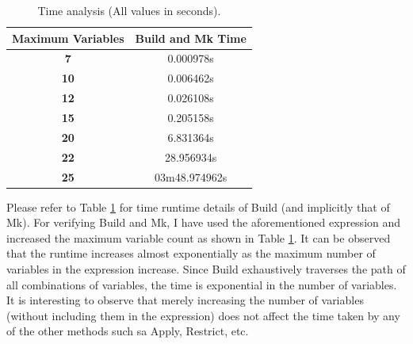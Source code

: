 \documentclass[a4paper, titlepage, 12pt]{article}
\numberwithin{equation}{section}
\begin{document}
            \begin{table}[H]
                \centering
                \caption{Time analysis (All values in seconds).}
                \label{tab:time_analysis}
                \begin{tabular}{|c|c|}
                    \hline \textbf{Maximum Variables} & \textbf{Build and Mk Time} \\ \hline
                    \textbf{7} & 0.000978s \\ \hline
                    \textbf{10} & 0.006462s \\ \hline
                    \textbf{12} & 0.026108s \\ \hline
                    \textbf{15} & 0.205158s \\ \hline
                    \textbf{20} & 6.831364s \\ \hline
                    \textbf{22} & 28.956934s \\ \hline
                    \textbf{25} & 03m48.974962s \\ \hline
                \end{tabular}
            \end{table}

            Please refer to Table \ref{tab:time_analysis} for time runtime details of Build (and implicitly that of Mk).
            For verifying Build and Mk, I have used the aforementioned expression and increased the maximum variable count as shown in Table \ref{tab:time_analysis}.
            It can be observed that the runtime increases almost exponentially as the maximum number of variables in the expression increase.
            Since Build exhaustively traverses the path of all combinations of variables, the time is exponential in the number of variables.
            It is interesting to observe that merely increasing the number of variables (without including them in the expression) does not affect the time taken by any of the other methods such sa Apply, Restrict, etc.
\end{document}
